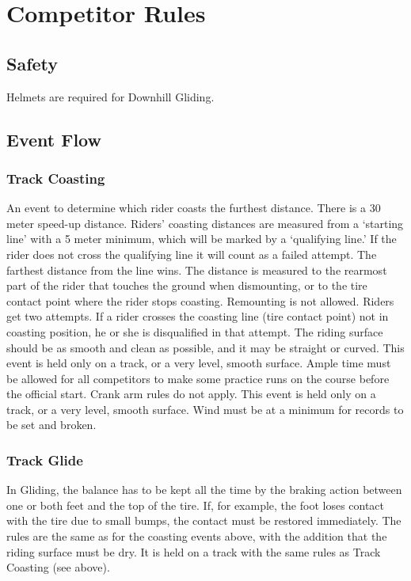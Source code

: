 \chapter{Competitor Rules}

\section{Safety}
Helmets are required for Downhill Gliding.

\section{Event Flow}


\subsection{Track Coasting}
An event to determine which rider coasts the furthest distance.
There is a 30 meter speed-up distance.
Riders' coasting distances are measured from a `starting line' with a 5 meter minimum, which will be marked by a `qualifying line.'
If the rider does not cross the qualifying line it will count as a failed attempt.
The farthest distance from the line wins.
The distance is measured to the rearmost part of the rider that touches the ground when dismounting, or to the tire contact point where the rider stops coasting.
Remounting is not allowed.
Riders get two attempts.
If a rider crosses the coasting line (tire contact point) not in coasting position, he or she is disqualified in that attempt.
The riding surface should be as smooth and clean as possible, and it may be straight or curved.
This event is held only on a track, or a very level, smooth surface.
Ample time must be allowed for all competitors to make some practice runs on the course before the official start.
Crank arm rules do not apply.
This event is held only on a track, or a very level, smooth surface.
Wind must be at a minimum for records to be set and broken.

\subsection{Track Glide}

In Gliding, the balance has to be kept all the time by the braking action between one or both feet and the top of the tire.
If, for example, the foot loses contact with the tire due to small bumps, the contact must be restored immediately.
The rules are the same as for the coasting events above, with the addition that the riding surface must be dry.
It is held on a track with the same rules as Track Coasting (see above).

